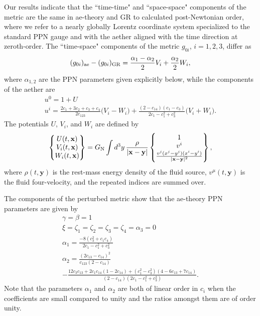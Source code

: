 \documentclass[aps,prd,preprint,amsmath,amssymb]{revtex4}
\def\beq{\begin{equation}}
\def\eeq{\end{equation}}
\def\a{\alpha}
\begin{document}
Our results indicate that the ``time-time" and ``space-space"
components of the metric are the same in ae-theory and GR to
calculated post-Newtonian order, where we refer to a nearly
globally Lorentz coordinate system specialized to the standard PPN
gauge and with the aether aligned with the time direction at
zeroth-order. The ``time-space" components of the metric $g_{0i}$,
$i=1,2,3$, differ as
%
\beq
    (g_{0i})_{\rm ae} - (g_{0i})_{\rm GR}
        = \frac{\a_1-\a_2}{2}V_i + \frac{\a_2}{2}W_i,
\eeq
%
where $\a_{1,2}$ are the PPN parameters given explicitly below,
while the components of the aether are
%
\begin{gather}
    u^0 = 1 + U\\
    u^i = \frac{2c_1+3c_2+c_3+c_4}{2 c_{123}}\big(V_i - W_i\big)
            +\frac{(2-c_{14})(c_1-c_3)}{2c_1-c_1^2+c^2_3}\big(V_i+W_i\big).
\end{gather}
The potentials $U$, $V_i$, and $W_i$ are defined by
%
\beq
\begin{Bmatrix}
    U(t,\mathbf{x})\\V_i(t,\mathbf{x})\\W_i(t,\mathbf{x})\end{Bmatrix}
        = G_{\rm N}\int d^3 y\,\frac{\rho}{|\mathbf{x}-\textbf{y}|}
        \begin{Bmatrix}
            1\\v^i\\\frac{v^j (x^j-y^j)(x^i - y^i)}{|\mathbf{x}-\mathbf{y}|^2}\end{Bmatrix},
\eeq
%
where $\rho(t,\mathbf{y})$ is the rest-mass energy density of the
fluid source, $v^\mu(t,\mathbf{y})$ is the fluid four-velocity,
and the repeated indices are summed over.

The components of the perturbed
metric show that  the ae-theory PPN parameters are given by
%
\begin{gather}\label{PARA}
    \gamma = \beta = 1\\
    \xi = \zeta_1=\zeta_2=\zeta_3=\zeta_4=\alpha_3 = 0\\
    \alpha_1= \frac{-8(c_3^2 + c_1c_4)}{2c_1 - c_1^2+c_3^2}\\
    \alpha_2=\frac{(2c_{13}-c_{14})^2}
{c_{123}(2-c_{14})}\nonumber\\
-\frac{12c_3c_{13}+2c_1c_{14}(1-2c_{14})+
(c_1^2-c_3^2)(4-6c_{13}+7c_{14})} {(2-c_{14})(2c_1 - c_1^2+c_3^2)}.
\end{gather}
%
Note that the parameters $\a_1$ and $\a_2$ are both
of linear order in $c_i$ when the coefficients are small compared
to unity and the ratios amongst them are of order unity.
\end{document}
